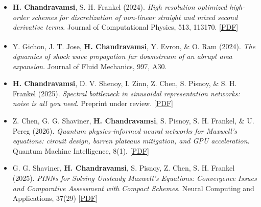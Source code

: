 \begin{itemize}[itemsep=0pt, topsep=0pt, label=]
    \item \textbf{H. Chandravamsi}, S. H. Frankel (2024). \textit{High resolution optimized high-order schemes for discretization of non-linear straight and mixed second derivative terms}. Journal of Computational Physics, 513, 113170. [\href{https://arxiv.org/pdf/2312.12069}{PDF}]
\end{itemize}

\begin{itemize}[itemsep=0pt, topsep=0pt, label=]
    \item Y. Gichon\textsuperscript{\textdagger}, J. T. Jose\textsuperscript{\textdagger}, \textbf{H. Chandravamsi}, Y. Evron, \& O. Ram (2024). \textit{The dynamics of shock wave propagation far downstream of an abrupt area expansion}. Journal of Fluid Mechanics, 997, A30.
\end{itemize}

\begin{itemize}[itemsep=0pt, topsep=5pt, label=]
    \item \textbf{H. Chandravamsi}, D. V. Shenoy, I. Zinn, Z. Chen, S. Pisnoy, \& S. H. Frankel (2025). \textit{Spectral bottleneck in sinusoidal representation networks: noise is all you need}. Preprint under review. [\href{https://arxiv.org/pdf/2509.09719}{PDF}]
\end{itemize}

\begin{itemize}[itemsep=0pt, topsep=5pt, label=]
    \item Z. Chen, G. G. Shaviner, \textbf{H. Chandravamsi}, S. Pisnoy, S. H. Frankel, \& U. Pereg (2026). \textit{Quantum physics-informed neural networks for Maxwell's equations: circuit design, barren plateaus mitigation, and GPU acceleration}. Quantum Machine Intelligence, 8(1). [\href{https://arxiv.org/abs/2506.23246}{PDF}]
\end{itemize}

\begin{itemize}[itemsep=0pt, topsep=5pt, label=]
    \item G. G. Shaviner, \textbf{H. Chandravamsi}, S. Pisnoy, Z. Chen, S. H. Frankel (2025). \textit{PINNs for Solving Unsteady Maxwell's Equations: Convergence Issues and Comparative Assessment with Compact Schemes}. Neural Computing and Applications, 37(29) [\href{https://arxiv.org/pdf/2504.12144}{PDF}]
\end{itemize}

